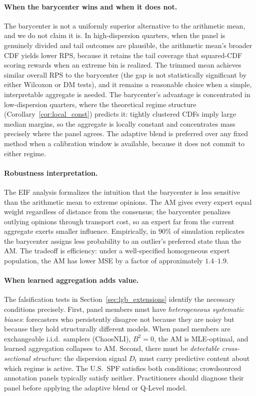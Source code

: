 \paragraph{When the barycenter wins and when it does not.}  The barycenter is not a uniformly superior alternative to the arithmetic mean, and we do not claim it is.  In high-dispersion quarters, when the panel is genuinely divided and tail outcomes are plausible, the arithmetic mean's broader CDF yields lower RPS, because it retains the tail coverage that squared-CDF scoring rewards when an extreme bin is realized.  The trimmed mean achieves similar overall RPS to the barycenter (the gap is not statistically significant by either Wilcoxon or DM tests), and it remains a reasonable choice when a simple, interpretable aggregate is needed.  The barycenter's advantage is concentrated in low-dispersion quarters, where the theoretical regime structure (Corollary~\ref{cor:local_const}) predicts it: tightly clustered CDFs imply large median margins, so the aggregate is locally constant and concentrates mass precisely where the panel agrees.  The adaptive blend is preferred over any fixed method when a calibration window is available, because it does not commit to either regime.

\paragraph{Robustness interpretation.}  The EIF analysis formalizes the intuition that the barycenter is less sensitive than the arithmetic mean to extreme opinions.  The AM gives every expert equal weight regardless of distance from the consensus; the barycenter penalizes outlying opinions through transport cost, so an expert far from the current aggregate exerts smaller influence.  Empirically, in $90\%$ of simulation replicates the barycenter assigns less probability to an outlier's preferred state than the AM.  The tradeoff is efficiency: under a well-specified homogeneous expert population, the AM has lower MSE by a factor of approximately $1.4$--$1.9$.


\paragraph{When learned aggregation adds value.}  The falsification tests in Section~\ref{sec:lgb_extensions} identify the necessary conditions precisely.  First, panel members must have \emph{heterogeneous systematic biases}: forecasters who persistently disagree not because they are noisy but because they hold structurally different models. When panel members are exchangeable i.i.d.\ samplers (ChaosNLI), $B^2 = 0$, the AM is MLE-optimal, and learned aggregation collapses to AM.  Second, there must be \emph{detectable cross-sectional structure}: the dispersion signal $D_t$ must carry predictive content about which regime is active.  The U.S.\ SPF satisfies both conditions; crowdsourced annotation panels typically satisfy neither.  Practitioners should diagnose their panel before applying the adaptive blend or Q-Level model.

